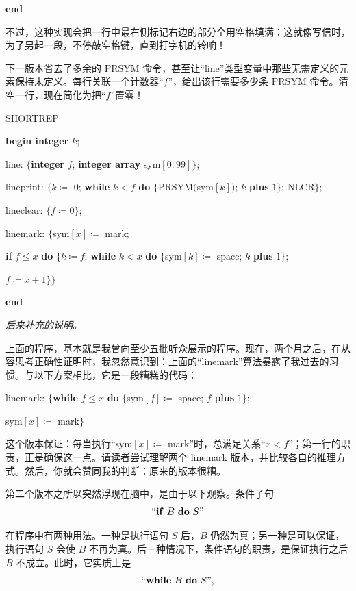 \noindent
\textbf{end}

不过，这种实现会把一行中最右侧标记右边的部分全用空格填满：这就像写信时，为了另起一段，不停敲空格键，直到打字机的铃响！

下一版本省去了多余的 PRSYM 命令，甚至让“line”类型变量中那些无需定义的元素保持未定义。每行关联一个计数器“$f$”，给出该行需要多少条 PRSYM 命令。清空一行，现在简化为把“$f$”置零！

\noindent
SHORTREP

\noindent
\textbf{begin integer} $k$;

\noindent
\quad line: $\{$\textbf{integer} $f$; \textbf{integer array} sym$[0 : 99]\}$;

\noindent
\quad lineprint: $\{k \coloneq$ 0; \textbf{while} $k < f$ \textbf{do} $\{$PRSYM$($sym$[k])$; $k$ \textbf{plus} $1\}$; NLCR$\}$;

\noindent
\quad lineclear: $\{f \coloneq 0\}$;

\noindent
\quad linemark: $\{$sym$[x] \coloneq$ mark;

\noindent
\quad \textbf{if} $f \leqslant x$ \textbf{do} $\{k \coloneq f$; \textbf{while} $k < x$ \textbf{do} $\{$sym$[k] \coloneq$ space; $k$ \textbf{plus} $1\}$;

\noindent
\quad \quad $f \coloneq x + 1\}\}$

\noindent
\textbf{end}

\noindent
\textit{后来补充的说明。}

上面的程序，基本就是我曾向至少五批听众展示的程序。现在，两个月之后，在从容思考正确性证明时，我忽然意识到：上面的“linemark”算法暴露了我过去的习惯。与以下方案相比，它是一段糟糕的代码：

linemark: $\{$\textbf{while} $f \leqslant x$ \textbf{do} $\{$sym$[f] \coloneq$ space; $f$ \textbf{plus} $1\};$
	
\quad sym$[x] \coloneq$ mark$\}$

\noindent
这个版本保证：每当执行“sym$[x] \coloneq$ mark”时，总满足关系“$x < f$”；第一行的职责，正是确保这一点。请读者尝试理解两个 linemark 版本，并比较各自的推理方式。然后，你就会赞同我的判断：原来的版本很糟。

第二个版本之所以突然浮现在脑中，是由于以下观察。条件子句
$$
\text{``\textbf{if} } B \text{ \textbf{do} } S\text{''}
$$

\noindent
在程序中有两种用法。一种是执行语句 $S$ 后，$B$ 仍然为真；另一种是可以保证，执行语句 $S$ 会使 $B$ 不再为真。后一种情况下，条件语句的职责，是保证执行之后 $B$ 不成立。此时，它实质上是
$$
\text{``\textbf{while} } B \text{ \textbf{do} } S\text{'',}
$$

